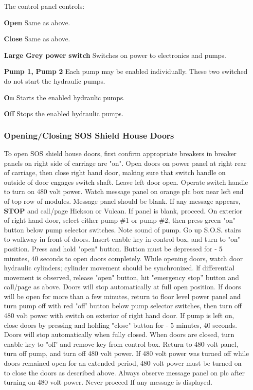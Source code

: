 The control panel controls:

\begin{description}
\item{\bf Open} Same as above.
\item{\bf Close} Same as above.
\item{\bf Large Grey power switch} Switches on power to electronics and pumps.
\item{\bf Pump 1, Pump 2} Each pump may be enabled individually. These two
switched do not start the hydraulic pumps.
\item{\bf On} Starts the enabled hydraulic pumps.
\item{\bf Off} Stops the enabled hydraulic pumps.
\end{description}

\subsubsection{Opening/Closing SOS Shield House Doors}

To open SOS shield house doors, first confirm appropriate breakers in
breaker panels on right side of carriage are "on". Open doors on power
panel at right rear of carriage, then close right hand door, making sure
that switch handle on outside of door engages switch shaft. Leave left door
open.
Operate switch handle to turn on 480 volt power. Watch message panel on
orange plc box near left end of top row of modules. Message panel should be
blank. If any message appears, {\bf STOP} and call/page Hickson or
Vulcan.  If panel is
blank, proceed. On exterior of right hand door, select either pump \#1 or
pump \#2, then press green "on" button below pump selector switches. Note
sound of pump. Go up S.O.S. stairs to walkway in front of doors. Insert
enable key in control box, and turn to "on" position. Press and hold "open"
button. Button must be depressed for - 5 minutes, 40 seconds to open doors
completely. While opening doors, watch door hydraulic cylinders; cylinder
movement should be synchronized. lf differential movement is observed,
release "open" button, hit "emergency stop'' button and call/page as 
above.  Doors will stop automatically at full open position.
If doors will be open for more than a few minutes, return to floor level
power panel and turn pump off with red "off' button below pump selector
switches, then turn off 480 volt power with switch on exterior of right
hand door. If pump is left on, close doors by pressing and holding "close"
button for - 5 minutes, 40 seconds. Doors will stop automatically when
fully closed.  When doors are closed, turn enable key to "off' and remove
key from control box. Return to 480 volt panel, turn off pump, and turn off
480 volt power. If 480 volt power was turned off while doors remained open
for an extended period, 480 volt power must be turned on to close the doors
as described above. Always observe message panel on plc after turning on
480 volt power. Never proceed If any message is displayed.

